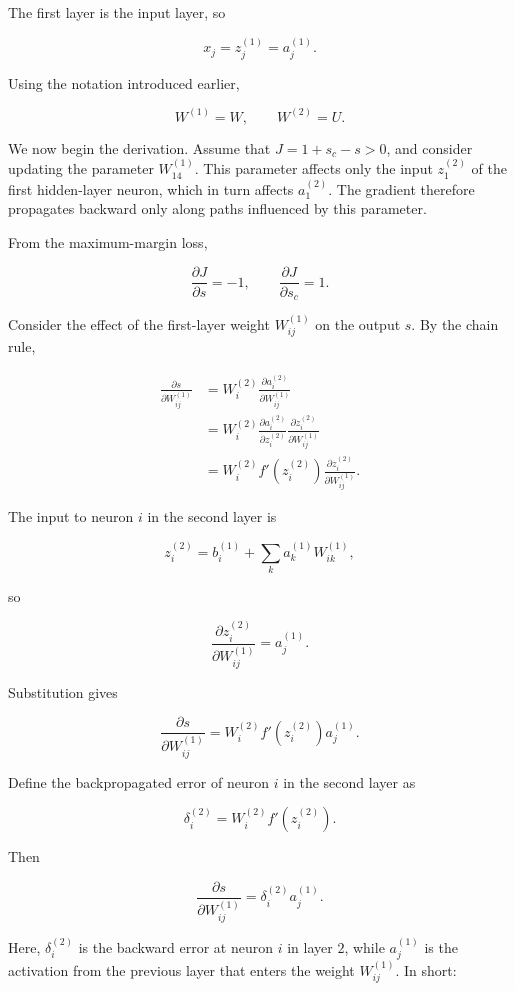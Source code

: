 \documentclass[
  a4paper,
  10pt]{article}
\begin{document}
The first layer is the input layer, so

\[
x_j=z_j^{(1)}=a_j^{(1)}.
\]

Using the notation introduced earlier,

\[
W^{(1)}=W,
\qquad
W^{(2)}=U.
\]

We now begin the derivation. Assume that \(J=1+s_c-s>0\), and consider
updating the parameter \(W_{14}^{(1)}\). This parameter affects only the
input \(z_1^{(2)}\) of the first hidden-layer neuron, which in turn
affects \(a_1^{(2)}\). The gradient therefore propagates backward only
along paths influenced by this parameter.

From the maximum-margin loss,

\[
\frac{\partial J}{\partial s}=-1,
\qquad
\frac{\partial J}{\partial s_c}=1.
\]

Consider the effect of the first-layer weight \(W_{ij}^{(1)}\) on the
output \(s\). By the chain rule,

\[
\begin{aligned}
\frac{\partial s}{\partial W_{ij}^{(1)}}
&=W_i^{(2)}\frac{\partial a_i^{(2)}}{\partial W_{ij}^{(1)}}\\
&=W_i^{(2)}
\frac{\partial a_i^{(2)}}{\partial z_i^{(2)}}
\frac{\partial z_i^{(2)}}{\partial W_{ij}^{(1)}}\\
&=W_i^{(2)}f'\left(z_i^{(2)}\right)
\frac{\partial z_i^{(2)}}{\partial W_{ij}^{(1)}}.
\end{aligned}
\]

The input to neuron \(i\) in the second layer is

\[
z_i^{(2)}
=b_i^{(1)}+\sum_k a_k^{(1)}W_{ik}^{(1)},
\]

so

\[
\frac{\partial z_i^{(2)}}{\partial W_{ij}^{(1)}}
=a_j^{(1)}.
\]

Substitution gives

\[
\frac{\partial s}{\partial W_{ij}^{(1)}}
=W_i^{(2)}f'\left(z_i^{(2)}\right)a_j^{(1)}.
\]

Define the backpropagated error of neuron \(i\) in the second layer as

\[
\delta_i^{(2)}
=W_i^{(2)}f'\left(z_i^{(2)}\right).
\]

Then

\[
\frac{\partial s}{\partial W_{ij}^{(1)}}
=\delta_i^{(2)}a_j^{(1)}.
\]

Here, \(\delta_i^{(2)}\) is the backward error at neuron \(i\) in layer
\(2\), while \(a_j^{(1)}\) is the activation from the previous layer
that enters the weight \(W_{ij}^{(1)}\). In short:
\end{document}
